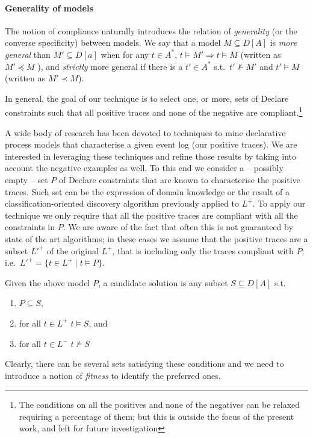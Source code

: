 \paragraph{Generality of models} The notion of compliance naturally introduces the relation of \emph{generality} (or the converse specificity) between models. We say that a model $M\subseteq D[A]$ is \emph{more general} than $M'\subseteq D[a]$ when for any $t\in A^*$, $t\models M' \Rightarrow t\models M$ (written as $M' \preceq M$ ), and \emph{strictly} more general if there is a $t'\in A^*$ s.t.\ $t'\not\models M'$ and $t'\models M$ (written as $M' \prec M$).

In general, the goal of our technique is to select one, or more, sets of Declare constraints such that all positive traces and none of the negative are compliant.\footnote{The conditions on all the positives and none of the negatives can be relaxed requiring a percentage of them; but this is outside the focus of the present work, and left for future investigation}

A wide body of research has been devoted to techniques to mine declarative process models that characterise a given event log (our positive traces). We are interested in leveraging these techniques and refine those results by taking into account the negative examples as well. To this end we consider a -- possibly empty -- set $P$ of Declare constraints that are known to characterise the positive traces. Such set can be the expression of domain knowledge or the result of a classification-oriented discovery algorithm previously applied to $L^+$. To apply our technique we only require that all the positive traces are compliant with all the constraints in $P$. We are aware of the fact that often this is not guaranteed by state of the art algorithms; in these cases we assume that the positive traces are a subset $L'^+$ of the original $L^+$, that is including only the traces compliant with $P$; i.e.\ $L'^+ = \{ t\in L^+\mid t\models P\}$.

Given the above model $P$, a candidate solution is any subset $S\subseteq D[A]$ s.t.
\begin{enumerate}
  \item $P\subseteq S$,
  \item for all $t\in L^+$ $t\models S$, and
  \item for all $t\in L^-$ $t\not\models S$
\end{enumerate}
Clearly, there can be several sets satisfying these conditions and we need to introduce a notion of \emph{fitness} to identify the preferred ones. 


